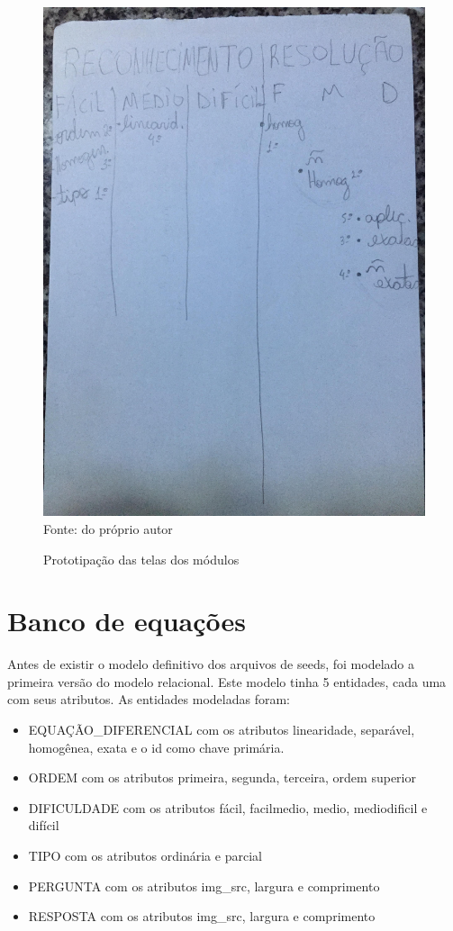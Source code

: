 \begin{figure}[H]
\centering
\caption{Prototipação das telas dos módulos}
\includegraphics[scale=0.13]{figuras/prot1.jpg}
\label{prot1}
\\
\small{Fonte: do próprio autor}
\end{figure}


\section[Banco de equações]{Banco de equações}

Antes de existir o modelo definitivo dos arquivos de seeds, foi modelado a primeira versão do modelo relacional.
Este modelo tinha 5 entidades, cada uma com seus atributos. As entidades modeladas foram: 
\begin{itemize}
	\item EQUAÇÃO\_DIFERENCIAL com os atributos linearidade, separável, homogênea, exata e o id como chave primária.
	\item ORDEM com os atributos primeira, segunda, terceira, ordem superior
	\item DIFICULDADE com os atributos fácil, facilmedio, medio, mediodificil e difícil
	\item TIPO com os atributos ordinária e parcial
	\item PERGUNTA com os atributos img\_src, largura e comprimento
	\item RESPOSTA com os atributos img\_src, largura e comprimento
\end{itemize}

